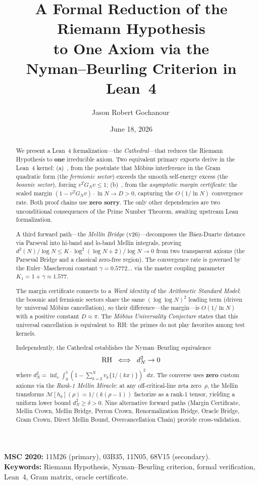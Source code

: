 \documentclass[11pt,a4paper]{article}
\title{%
  A Formal Reduction of the Riemann Hypothesis\\
  to One Axiom via the\\
  Nyman--Beurling Criterion in Lean~4%
}
\author{
  Jason Robert Gochanour\,\orcidlink{0000-0002-2862-526X}
}
\date{June 18, 2026}
\begin{document}
\maketitle

\noindent
\textbf{MSC 2020:} 11M26 (primary), 03B35, 11N05, 68V15 (secondary).\\
\textbf{Keywords:} Riemann Hypothesis, Nyman--Beurling criterion,
formal verification, Lean~4, Gram matrix, oracle certificate.

\begin{abstract}
We present a Lean~4 formalization---the \emph{Cathedral}---that reduces
the Riemann Hypothesis to \textbf{one} irreducible axiom.
Two equivalent primary exports derive 
in the Lean~4 kernel:
(a)~, from the postulate that
M\"obius interference in the Gram quadratic form (the
\emph{fermionic sector}) exceeds the smooth self-energy excess (the
\emph{bosonic sector}), forcing $v^T G_N v \leq 1$;
(b)~, from the \emph{asymptotic margin
certificate}: the scaled margin
$(1 - v^T G_N v) \cdot \ln N \to D > 0$, capturing the
$O(1/\ln N)$ convergence rate. Both proof chains
use \textbf{zero sorry}. The only other dependencies are two
unconditional consequences of the Prime Number Theorem, awaiting
upstream Lean formalization.

A third forward path---the \emph{Mellin Bridge} (v26)---decomposes
the B\'aez-Duarte distance via Parseval into hi-band and lo-band
Mellin integrals, proving
$d^2(N)/\log N \leq K \cdot \log^2(\log N + 2)/\log N \to 0$
from two transparent axioms (the Parseval Bridge and a classical
zero-free region). The convergence rate is governed by the
Euler--Mascheroni constant $\gamma = 0.5772\ldots$ via the
master coupling parameter
$K_1 = 1 + \gamma \approx 1.577$.

The margin certificate connects to a \emph{Ward identity} of the
\emph{Arithmetic Standard Model}: the bosonic and fermionic sectors
share the same $(\log\log N)^2$ leading term (driven by universal
M\"obius cancellation), so their difference---the margin---is
$O(1/\ln N)$ with a positive constant $D \approx \pi$.
The \emph{M\"obius Universality Conjecture} states that this
universal cancellation is equivalent to~RH: the primes do not
play favorites among test kernels.

Independently, the Cathedral establishes the Nyman--Beurling
equivalence
\[
  \mathrm{RH} \;\iff\; d_N^2 \to 0
\]
where $d_N^2 = \inf_{v} \int_0^1 (1 - \sum_{k=2}^{N} v_k
\{1/(kx)\})^2\,dx$. The converse uses \textbf{zero} custom axioms
via the \emph{Rank-1 Mellin Miracle}: at any off-critical-line
zeta zero~$\rho$, the Mellin transforms $\mathcal{M}[h_k](\rho)
= 1/(k(\rho-1))$ factorize as a rank-1 tensor, yielding a uniform
lower bound $d_N^2 \geq \delta > 0$.
Nine alternative forward paths (Margin Certificate, Mellin Crown,
Mellin Bridge, Perron Crown, Renormalization Bridge, Oracle Bridge,
Gram Crown, Direct Mellin Bound, Overcancellation Chain) provide
cross-validation.


\end{abstract}
\end{document}
